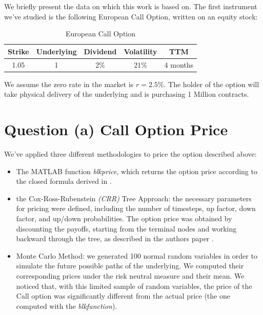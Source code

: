 We briefly present the data on which this work is based on. The first instrument we've studied is the following European Call Option, written on an equity stock:

\begin{table}[H]
    \centering
    \begin{tabular}{|c|c|c|c|c|}
        \hline
        Strike & Underlying & Dividend & Volatility & TTM \\
        \hline
        1.05 & 1 & 2\% &21\% & 4 months \\
        \hline
    \end{tabular}
    \caption{European Call Option}
    \label{tab:market data}
\end{table}

We assume the zero rate in the market is $r = 2.5\%$. 
The holder of the option will take physical delivery of the underlying and is purchasing 1 Million contracts. 

\section{Question (a) Call Option Price}
We've applied three different methodologies to price the option described above:

\begin{itemize}
\item The \textsc{MATLAB} function \textit{blkprice}, which returns the option price according to the closed formula derived in \cite{black}.

\item the Cox-Ross-Rubenstein \textit{(CRR)} Tree Approach: the necessary parameters for pricing were defined, including the number of timesteps, up factor, down factor, and up/down probabilities. The option price was obtained by discounting the payoffs, starting from the terminal nodes and working backward through the tree, as described in the authors paper \cite{CRR}.

\item Monte Carlo Method: we generated 100 normal random variables in order to simulate the future possible paths of the underlying. We computed their corresponding prices under the risk neutral measure and their mean. We noticed that, with this limited sample of random variables, the price of the Call option was significantly different from the actual price (the one computed with the \textit{blkfunction}).
\end{itemize}

